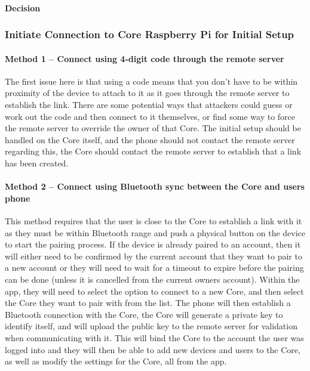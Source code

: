 \paragraph{Decision}

\subsubsection{Initiate Connection to Core Raspberry Pi for Initial Setup}

\paragraph{Method 1 – Connect using 4-digit code through the remote server}
The first issue here is that using a code means that you don’t have to be within proximity of the device to attach to it as it goes through the remote server to establish the link. There are some potential ways that attackers could guess or work out the code and then connect to it themselves, or find some way to force the remote server to override the owner of that Core. The initial setup should be handled on the Core itself, and the phone should not contact the remote server regarding this, the Core should contact the remote server to establish that a link has been created.

\paragraph{Method 2 – Connect using Bluetooth sync between the Core and users phone}
This method requires that the user is close to the Core to establish a link with it as they must be within Bluetooth range and push a physical button on the device to start the pairing process. If the device is already paired to an account, then it will either need to be confirmed by the current account that they want to pair to a new account or they will need to wait for a timeout to expire before the pairing can be done (unless it is cancelled from the current owners account). Within the app, they will need to select the option to connect to a new Core, and then select the Core they want to pair with from the list. The phone will then establish a Bluetooth connection with the Core, the Core will generate a private key to identify itself, and will upload the public key to the remote server for validation when communicating with it. This will bind the Core to the account the user was logged into and they will then be able to add new devices and users to the Core, as well as modify the settings for the Core, all from the app.

